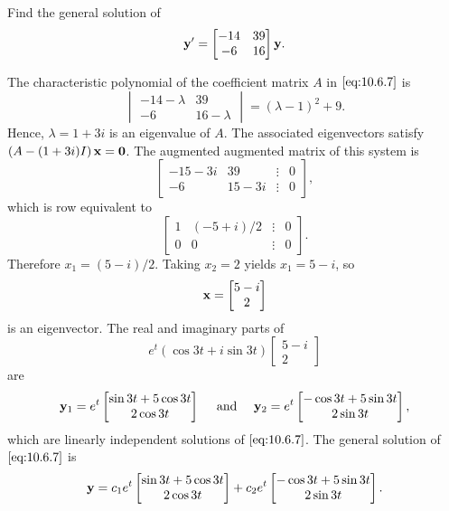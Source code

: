 \documentclass{ximera}
\begin{document}
\begin{example}\label{example:10.6.2}
 Find  the general solution of
\begin{equation} \label{eq:10.6.7}
{\bf y}'=\begin{bmatrix}-14&39\\-6&16\end{bmatrix}{\bf y}.
\end{equation}

\begin{explanation}
The characteristic polynomial of the coefficient matrix $A$
in $\eqref{eq:10.6.7}$ is
$$
\begin{vmatrix}-14-\lambda&39\\-6&16-\lambda
\end{vmatrix}=(\lambda-1)^2+9.
$$
Hence, $\lambda=1+3i$ is an eigenvalue of $A$. The associated
eigenvectors satisfy $\left(A-(1+3i)I\right){\bf x}={\bf 0}$. The
augmented augmented matrix of this system is
$$
\begin{bmatrix}-15-3i&39&\vdots&0\\
-6&15-3i&\vdots&0  \end{bmatrix},
 $$
which is row equivalent to
$$
\begin{bmatrix}1&(-5+i)/2&\vdots&0\\ 0&0&\vdots&0
\end{bmatrix}.
$$
Therefore $x_1=(5-i)/2$. Taking $x_2=2$ yields $x_1=5-i$, so
$$
{\bf x}=\begin{bmatrix}5-i\\2\end{bmatrix}
$$
is an eigenvector. The real and imaginary parts of
$$
e^t(\cos3t+i\sin3t)\begin{bmatrix}5-i\\2\end{bmatrix}
$$
 are
$$
{\bf y}_1=e^t\begin{bmatrix}\sin3t+5\cos3t\\2\cos
3t\end{bmatrix}\quad\mbox{ and }\quad
{\bf y}_2=e^t\begin{bmatrix}-\cos3t+5\sin3t\\2\sin
3t\end{bmatrix},
 $$
which are  linearly independent solutions of  $\eqref{eq:10.6.7}$.
The general solution of $\eqref{eq:10.6.7}$ is
$$
{\bf y}=c_1e^t\begin{bmatrix}\sin3t+5\cos3t\\2\cos
3t\end{bmatrix}+
c_2e^t\begin{bmatrix}-\cos3t+5\sin3t\\2\sin
3t\end{bmatrix}.
$$
\end{explanation}
\end{example}
\end{document}
